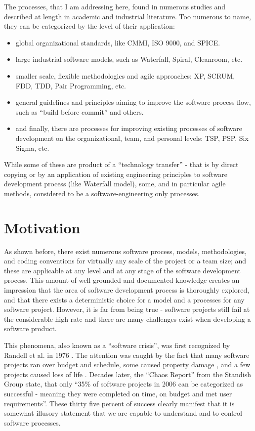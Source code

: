 The processes, that I am addressing here, found in numerous studies and described at length in 
academic and industrial literature. Too numerous to name, they can be categorized by the level 
of their application:
\begin{itemize}
 \item global organizational standards, like CMMI, ISO 9000, and SPICE. 
 \item large industrial software models, such as Waterfall, Spiral, Cleanroom, etc.
 \item smaller scale, flexible methodologies and agile approaches: XP, SCRUM, FDD, 
TDD, Pair Programming, etc.
 \item general guidelines and principles aiming to improve the software process flow, 
such as ``build before commit'' and others.
 \item and finally, there are processes for improving existing processes of software development 
on the organizational, team, and personal levels: TSP, PSP, Six Sigma, etc.
\end{itemize}
While some of these are product of a ``technology transfer'' - that is by direct copying or by an 
application of existing engineering principles to software development process (like Waterfall model), 
some, and in particular agile methods, considered to be a software-engineering only processes. 

\section{Motivation}
As shown before, there exist numerous software process, models, methodologies, 
and coding conventions for virtually any scale of the project or a team size; and these are
applicable at any level and at any stage of the software development process. This amount of 
well-grounded and documented knowledge creates an impression that the area of software development 
process is thoroughly explored, and that there exists a deterministic choice for a model and a 
processes for any software project. However, it is far from being true - software projects still fail 
at the considerable high rate and there are many challenges exist when developing a software product.

This phenomena, also known as a ``software crisis'', was first recognized by Randell et al. in 1976 
\cite{naur1976software}. The attention was caught by the fact that many software projects ran 
over budget and schedule, some caused property damage \cite{citeulike:11044022}, and a few projects caused 
loss of life \cite{citeulike:712058}. Decades later, the ``Chaos Report'' from the Standish 
Group \cite{SDTimes} state, that only ``35\% of software projects in 2006 can 
be categorized as successful - meaning they were completed on time, on budget and met 
user requirements''. These thirty five percent of success clearly manifest that it is somewhat 
illusory statement that we are capable to understand and to control software processes.


